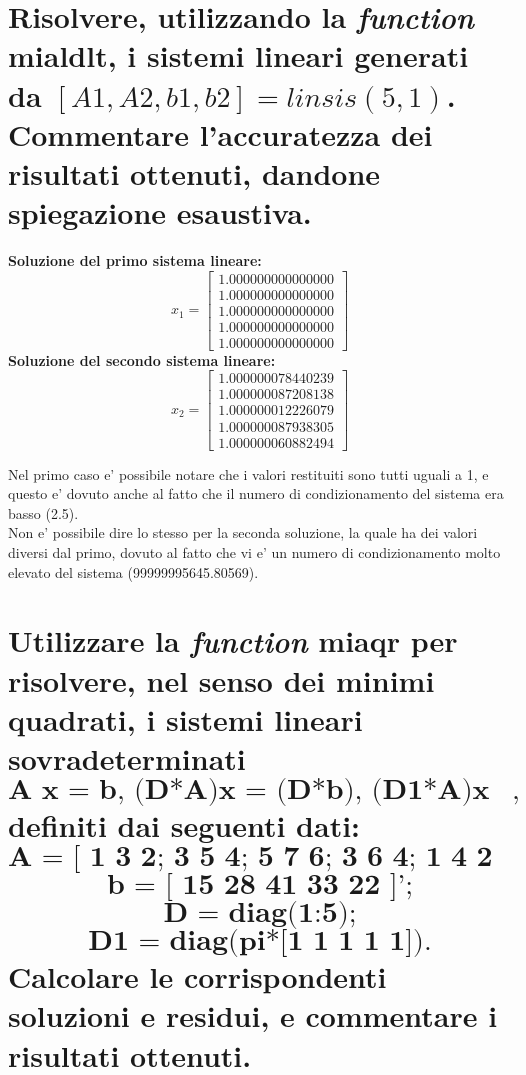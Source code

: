 \documentclass[10pt,a4paper]{article}
\begin{document}
\newpage
\section{Risolvere, utilizzando la \textit{function} \textbf{mialdlt}, i sistemi
  lineari generati da \textbf{$ [A1,A2,b1,b2]=linsis(5,1)$}.
  \\
  Commentare l'accuratezza
  dei risultati ottenuti, dandone spiegazione esaustiva.}

\textbf{Soluzione del primo sistema lineare:}
\[
  x_1 =
  \begin{bmatrix}
    1.000000000000000 \\
    1.000000000000000 \\
    1.000000000000000 \\
    1.000000000000000 \\
    1.000000000000000
  \end{bmatrix}
\]
\textbf{Soluzione del secondo sistema lineare:}
\[
  x_2 =
  \begin{bmatrix}
    1.000000078440239 \\
    1.000000087208138 \\
    1.000000012226079 \\
    1.000000087938305 \\
    1.000000060882494
  \end{bmatrix}
\]

Nel primo caso e' possibile notare che i valori restituiti sono tutti uguali a 1,
e questo e' dovuto anche al fatto che il numero di condizionamento del sistema
era basso (2.5).
\\
Non e' possibile dire lo stesso per la seconda soluzione, la quale ha dei valori
diversi dal primo, dovuto al fatto che vi e' un numero di condizionamento
molto elevato del sistema (99999995645.80569).

\section{Utilizzare la \textit{function} \textbf{miaqr} per risolvere, nel senso dei
  minimi quadrati, i sistemi lineari sovradeterminati
  $$ \textbf{A x = b, (D*A)x = (D*b), (D1*A)x = (D1*b)}, $$
  definiti dai seguenti dati:
  $$ \textbf{A = [ 1 3 2; 3 5 4; 5 7 6; 3 6 4; 1 4 2 ];} $$
  $$ \textbf{b = [ 15 28 41 33 22 ]';} $$
  $$ \textbf{D = diag(1:5);} $$
  $$ \textbf{D1 = diag(pi*[1 1 1 1 1]).} $$
  Calcolare le corrispondenti soluzioni e residui, e commentare i risultati ottenuti.}
\end{document}
